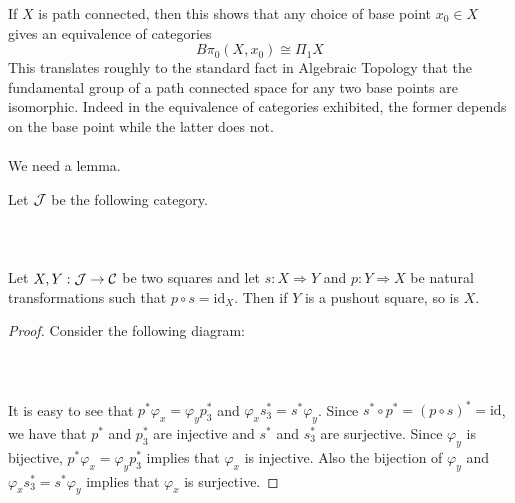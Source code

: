 \documentclass[a4paper]{article}
\begin{document}
If $X$ is path connected, then this shows that any choice of base point $x_0\in X$ gives an equivalence of categories $$B\pi_0(X,x_0)\cong\Pi_1X$$ This translates roughly to the standard fact in Algebraic Topology that the fundamental group of a path connected space for any two base points are isomorphic. Indeed in the equivalence of categories exhibited, the former depends on the base point while the latter does not. \\~\\

We need a lemma. 

\begin{lmm}{}{} Let $\mathcal{J}$ be the following category. \\~\\
 \\~\\
Let $X,Y:\mathcal{J}\to\mathcal{C}$ be two squares and let $s:X\Rightarrow Y$ and $p:Y\Rightarrow X$ be natural transformations such that $p\circ s=\text{id}_X$. Then if $Y$ is a pushout square, so is $X$. \tcbline
\begin{proof}
Consider the following diagram: \\~\\
 \\~\\
It is easy to see that $p^\ast\varphi_x=\varphi_yp_3^\ast$ and $\varphi_xs_3^\ast=s^\ast\varphi_y$. Since $s^\ast\circ p^\ast=(p\circ s)^\ast=\text{id}$, we have that $p^\ast$ and $p_3^\ast$ are injective and $s^\ast$ and $s_3^\ast$ are surjective. Since $\varphi_y$ is bijective, $p^\ast\varphi_x=\varphi_yp_3^\ast$ implies that $\varphi_x$ is injective. Also the bijection of $\varphi_y$ and $\varphi_xs_3^\ast=s^\ast\varphi_y$ implies that $\varphi_x$ is surjective. 
\end{proof}
\end{lmm}
\end{document}
